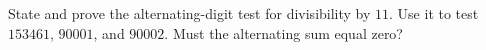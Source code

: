 State and prove the alternating-digit test for divisibility by $11$. Use it to test $153461$, $90001$, and $90002$. Must the alternating sum equal zero?
